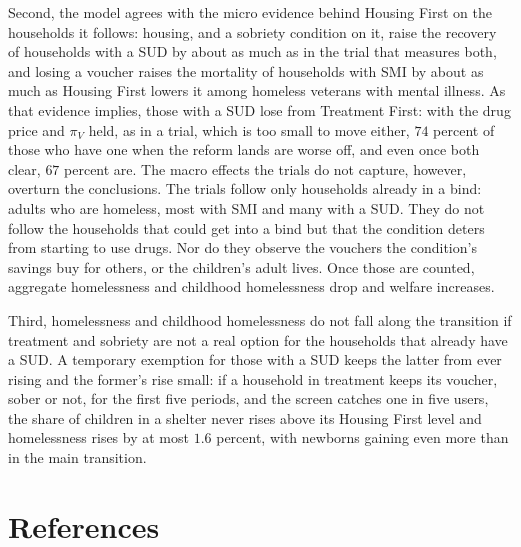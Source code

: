 \documentclass[10pt]{article}
\newif\ifshowupdates \showupdatesfalse
\newcommand{\updnum}[1]{\ifshowupdates{\color{blue}#1}\else#1\fi}
\begin{document}
Second, the model agrees with the micro evidence behind Housing First on the households it follows: housing, and a sobriety condition on it, raise the recovery of households with a SUD by about as much as in the trial that measures both, and losing a voucher raises the mortality of households with SMI by about as much as Housing First lowers it among homeless veterans with mental illness. As that evidence implies, those with a SUD lose from Treatment First: with the drug price and $\pi_V$ held, as in a trial, which is too small to move either, $74$ percent of those who have one when the reform lands are worse off, and even once both clear, \updnum{$67$} percent are. The macro effects the trials do not capture, however, overturn the conclusions. The trials follow only households already in a bind: adults who are homeless, most with SMI and many with a SUD. They do not follow the households that could get into a bind but that the condition deters from starting to use drugs. Nor do they observe the vouchers the condition's savings buy for others, or the children's adult lives. Once those are counted, aggregate homelessness and childhood homelessness drop and welfare increases.

Third, homelessness and childhood homelessness do not fall along the transition if treatment and sobriety are not a real option for the households that already have a SUD. A temporary exemption for those with a SUD keeps the latter from ever rising and the former's rise small: if a household in treatment keeps its voucher, sober or not, for the first five periods, and the screen catches one in five users, the share of children in a shelter never rises above its Housing First level and homelessness rises by at most $1.6$ percent, with newborns gaining even more than in the main transition.

\clearpage


\section*{References}
\end{document}

